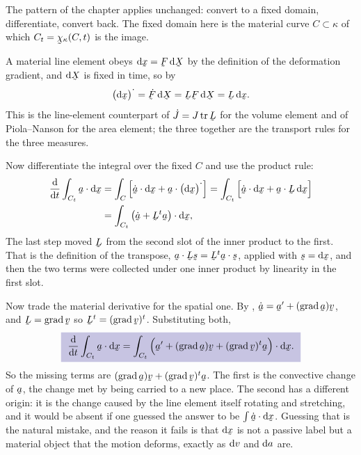 \begin{solution}
The pattern of the chapter applies unchanged: convert to a fixed domain,
differentiate, convert back. The fixed domain here is the material curve
$C\subset\kappa$ of which $C_{t}=\bchi_{\kappa}(C,t)$ is the image.

A material line element obeys $\dl\bx=\bF\,\dl\bX$ by the definition of
the deformation gradient, and $\dl\bX$ is fixed in time, so by 
\[
   \big(\dl\bx\big)^{\textstyle\cdot}=\dot\bF\,\dl\bX=\bL\bF\,\dl\bX
   =\bL\,\dl\bx .
\]
This is the line-element counterpart of $\dot J=J\tr\bL$ for the volume
element and of Piola--Nanson for the area element; the three together are
the transport rules for the three measures.

Now differentiate the integral over the fixed $C$ and use the product
rule:
\[
\begin{aligned}
   \frac{\dl}{\dl t}\int_{C_{t}}\ip\ba{\dl\bx}
   &=\int_{C}\Big[\ip{\dot\ba}{\dl\bx}
     +\ip\ba{\big(\dl\bx\big)^{\textstyle\cdot}}\Big]
    =\int_{C_{t}}\Big[\ip{\dot\ba}{\dl\bx}+\ip\ba{\bL\,\dl\bx}\Big]\\
   &=\int_{C_{t}}\ip{\big(\dot\ba+\bL^{t}\ba\big)}{\dl\bx},
\end{aligned}
\]
The last step moved $\bL$ from the second slot of the inner product to the
first. That is the definition of the transpose,
$\ip\ba{\bL\bs}=\ip{\bL^{t}\ba}\bs$, applied with $\bs=\dl\bx$, and then
the two terms were collected under one inner product by linearity in the
first slot.

Now trade the material derivative for the spatial one. By ,
$\dot\ba=\ba'+(\grad\ba)\bv$, and $\bL=\grad\bv$ so $\bL^{t}
=(\grad\bv)^{t}$. Substituting both,
\[
   \boxed{\ \frac{\dl}{\dl t}\int_{C_{t}}\ip\ba{\dl\bx}
   =\int_{C_{t}}\ip{\Big(\ba'+(\grad\ba)\bv+(\grad\bv)^{t}\ba\Big)}{\dl\bx}.\ }
\]
So the missing terms are $(\grad\ba)\bv+(\grad\bv)^{t}\ba$. The first is
the convective change of $\ba$, the change met by being carried to a new
place. The second has a different origin: it is the change caused by the
line element itself rotating and stretching, and it would be absent if one
guessed the answer to be $\int\ip{\dot\ba}{\dl\bx}$. Guessing that is the
natural mistake, and the reason it fails is that $\dl\bx$ is not a passive
label but a material object that the motion deforms, exactly as $\mathrm{d} v$
and $\mathrm{d} a$ are.


\end{solution}
